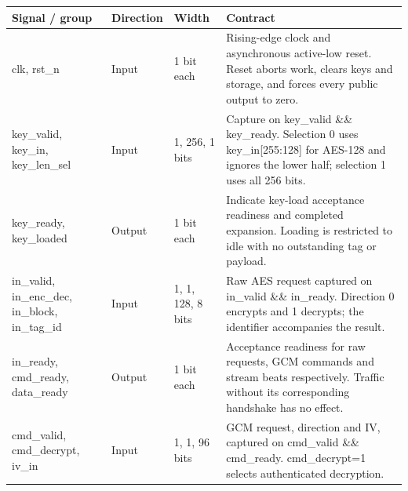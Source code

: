 \documentclass[11pt,a4paper]{article}
\begin{document}
{\small\renewcommand{\arraystretch}{1.18}\begin{longtable}{@{}L{0.21\textwidth}|L{0.12\textwidth}|L{0.12\textwidth}|L{0.45\textwidth}@{}}\toprule

\textbf{Signal /\allowbreak{} group} & \textbf{Direction} & \textbf{Width} & \textbf{Contract}\\\midrule\endhead

clk,\allowbreak{} rst\_\allowbreak{}n & Input & 1 bit each & Rising-edge clock and asynchronous active-low reset. Reset aborts work,\allowbreak{} clears keys and storage,\allowbreak{} and forces every public output to zero.\\[2pt]\hline

key\_\allowbreak{}valid,\allowbreak{} key\_\allowbreak{}in,\allowbreak{} key\_\allowbreak{}len\_\allowbreak{}sel & Input & 1,\allowbreak{} 256,\allowbreak{} 1 bits & Capture on key\_\allowbreak{}valid \&\& key\_\allowbreak{}ready. Selection 0 uses key\_\allowbreak{}in[\allowbreak{}255:128]\allowbreak{} for AES-128 and ignores the lower half; selection 1 uses all 256 bits.\\[2pt]\hline

key\_\allowbreak{}ready,\allowbreak{} key\_\allowbreak{}loaded & Output & 1 bit each & Indicate key-load acceptance readiness and completed expansion. Loading is restricted to idle with no outstanding tag or payload.\\[2pt]\hline

in\_\allowbreak{}valid,\allowbreak{} in\_\allowbreak{}enc\_\allowbreak{}dec,\allowbreak{} in\_\allowbreak{}block,\allowbreak{} in\_\allowbreak{}tag\_\allowbreak{}id & Input & 1,\allowbreak{} 1,\allowbreak{} 128,\allowbreak{} 8 bits & Raw AES request captured on in\_\allowbreak{}valid \&\& in\_\allowbreak{}ready. Direction 0 encrypts and 1 decrypts; the identifier accompanies the result.\\[2pt]\hline

in\_\allowbreak{}ready,\allowbreak{} cmd\_\allowbreak{}ready,\allowbreak{} data\_\allowbreak{}ready & Output & 1 bit each & Acceptance readiness for raw requests,\allowbreak{} GCM commands and stream beats respectively. Traffic without its corresponding handshake has no effect.\\[2pt]\hline

cmd\_\allowbreak{}valid,\allowbreak{} cmd\_\allowbreak{}decrypt,\allowbreak{} iv\_\allowbreak{}in & Input & 1,\allowbreak{} 1,\allowbreak{} 96 bits & GCM request,\allowbreak{} direction and IV,\allowbreak{} captured on cmd\_\allowbreak{}valid \&\& cmd\_\allowbreak{}ready. cmd\_\allowbreak{}decrypt=\allowbreak{}1 selects authenticated decryption.\\[2pt]\hline


\end{longtable}}
\end{document}
